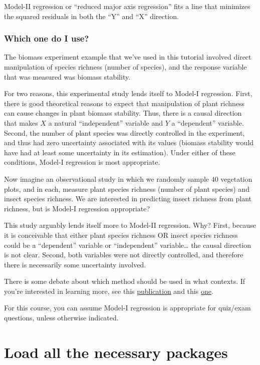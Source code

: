 \documentclass[
]{book}
\begin{document}
Model-II regression or ``reduced major axis regression'' fits a line that minimizes the squared residuals in both the ``Y'' and ``X'' direction.

\subsection{Which one do I use?}\label{which-one-do-i-use}

The biomass experiment example that we've used in this tutorial involved direct manipulation of species richness (number of species), and the response variable that was measured was biomass stability.

For two reasons, this experimental study lends itself to Model-I regression. First, there is good theoretical reasons to expect that manipulation of plant richness can cause changes in plant biomass stability. Thus, there is a causal direction that makes \(X\) a natural ``independent'' variable and \(Y\) a ``dependent'' variable. Second, the number of plant species was directly controlled in the experiment, and thus had zero uncertainty associated with its values (biomass stability would have had at least some uncertainty in its estimation). Under either of these conditions, Model-I regression is most appropriate.

Now imagine an observational study in which we randomly sample 40 vegetation plots, and in each, measure plant species richness (number of plant species) and insect species richness. We are interested in predicting insect richness from plant richness, but is Model-I regression appropriate?

This study arguably lends itself more to Model-II regression. Why? First, because it is conceivable that either plant species richness OR insect species richness could be a ``dependent'' variable or ``independent'' variable\ldots{} the causal direction is not clear. Second, both variables were not directly controlled, and therefore there is necessarily some uncertainty involved.

There is some debate about which method should be used in what contexts. If you're interested in learning more, see this \href{https://doi.org/10.1017/S1464793106007007}{publication} and this \href{https://doi.org/10.1002/ajpa.21090}{one}.

For this course, you can assume Model-I regression is appropriate for quiz/exam questions, unless otherwise indicated.

\chapter*{Load all the necessary packages}\label{load-all-the-necessary-packages}
\end{document}
